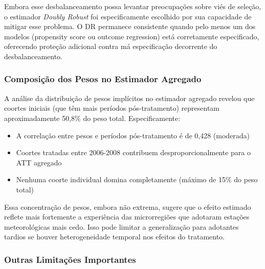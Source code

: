 \documentclass[
	12pt,				%
	oneside,			%
	a4paper,			%
	english,			%
	french,				%
	spanish,			%
	brazil				%
	]{abntex2}
\begin{document}
Embora esse desbalanceamento possa levantar preocupações sobre viés de seleção, o estimador \textit{Doubly Robust} foi especificamente escolhido por sua capacidade de mitigar esse problema. O DR permanece consistente quando pelo menos um dos modelos (propensity score ou outcome regression) está corretamente especificado, oferecendo proteção adicional contra má especificação decorrente do desbalanceamento.

\subsubsection{Composição dos Pesos no Estimador Agregado}

A análise da distribuição de pesos implícitos no estimador agregado revelou que coortes iniciais (que têm mais períodos pós-tratamento) representam aproximadamente 50,8\% do peso total. Especificamente:

\begin{itemize}
\item A correlação entre pesos e períodos pós-tratamento é de 0,428 (moderada)
\item Coortes tratadas entre 2006-2008 contribuem desproporcionalmente para o ATT agregado
\item Nenhuma coorte individual domina completamente (máximo de 15\% do peso total)
\end{itemize}

Essa concentração de pesos, embora não extrema, sugere que o efeito estimado reflete mais fortemente a experiência das microrregiões que adotaram estações meteorológicas mais cedo. Isso pode limitar a generalização para adotantes tardios se houver heterogeneidade temporal nos efeitos do tratamento.

\subsubsection{Outras Limitações Importantes}
\end{document}
